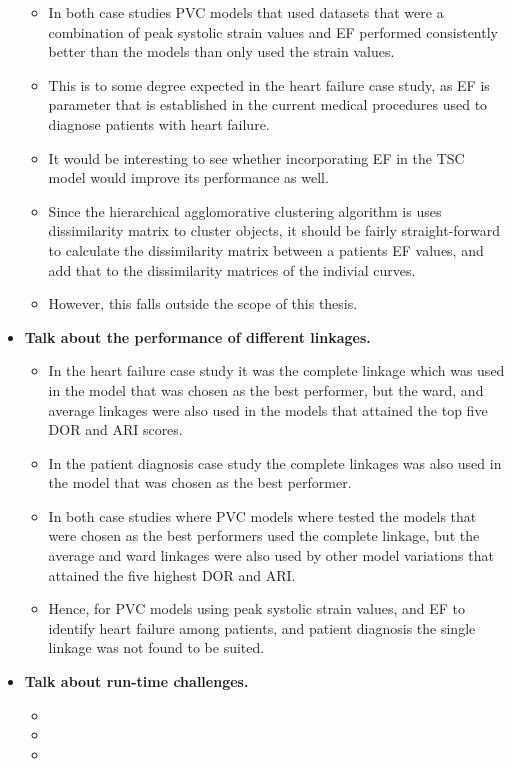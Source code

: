 \begin{itemize}
    \begin{itemize}
        \item In both case studies PVC models that used datasets that were a combination of peak systolic strain values and EF performed consistently better than the models than only
              used the strain values. 
        \item This is to some degree expected in the heart failure case study, as EF is parameter that is established in the current medical procedures used to diagnose patients with heart failure.
        \item It would be interesting to see whether incorporating EF in the TSC model would improve its performance as well.
        \item Since the hierarchical agglomorative clustering algorithm is uses dissimilarity matrix to cluster objects, 
              it should be fairly straight-forward to calculate the dissimilarity matrix between a patients EF values, and add that to the dissimilarity matrices of the indivial curves.
        \item However, this falls outside the scope of this thesis.
    \end{itemize}
    \item \textbf{Talk about the performance of different linkages.}
    \begin{itemize}
        \item In the heart failure case study it was the complete linkage which was used in the model that was chosen as the best performer, but the ward, and average linkages were also used
              in the models that attained the top five DOR and ARI scores.
        \item In the patient diagnosis case study the complete linkages was also used in the model that was chosen as the best performer.
        \item In both case studies where PVC models where tested the models that were chosen as the best performers used the complete linkage, but the average and ward linkages were also used by
              other model variations that attained the five highest DOR and ARI.
        \item Hence, for PVC models using peak systolic strain values, and EF to identify heart failure among patients, and patient diagnosis the single linkage was not found to be suited.
    \end{itemize}
    \item \textbf{Talk about run-time challenges.}
    \begin{itemize}
        \item 
        \item 
        \item 
    \end{itemize}
\end{itemize}

